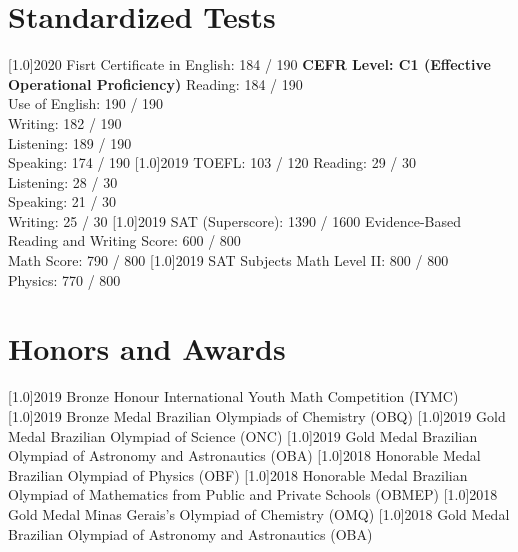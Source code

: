 \documentclass[]{cv-style}
\begin{document}
\section{Standardized Tests}
  \vspace{-0.2cm}
    \begin{entrylist}
        \entry
            {\scalebox{.8}[1.0]{2020}}
            {Fisrt Certificate in English: 184 / 190}
            {\textbf{CEFR Level: C1 (Effective Operational     Proficiency)}}
            {Reading: 184 / 190\\ Use of English: 190 / 190\\ Writing: 182 / 190\\ Listening: 189 / 190\\ Speaking: 174 / 190}
        \entry
            {\scalebox{.8}[1.0]{2019}}
            {TOEFL: 103 / 120} 
            {}
            {Reading: 29 / 30\\ Listening: 28 / 30    \\ Speaking: 21 / 30\\ Writing: 25 / 30}
        \entry
            {\scalebox{.8}[1.0]{2019}}
            {SAT (Superscore): 1390 / 1600} 
            {}
            {Evidence-Based Reading and Writing Score: 600 / 800\\ Math Score: 790 / 800}
        \entry
            {\scalebox{.8}[1.0]{2019}}
            {SAT Subjects}
            {}
            {Math Level II: 800 / 800\\ Physics: 770 / 800}
\end{entrylist}

\section{Honors and Awards}
    \vspace{-0.2cm}
    \begin{entrylist}
        \entry
            {\scalebox{.8}[1.0]{2019}}
            {Bronze Honour}
            {}
            {International Youth Math Competition (IYMC)}
        \entry
            {\scalebox{.8}[1.0]{2019}}
            {Bronze Medal}
            {}
            {Brazilian Olympiads of Chemistry (OBQ)}
        \entry
            {\scalebox{.8}[1.0]{2019}}
            {Gold Medal}
            {}
            {Brazilian Olympiad of Science (ONC)}
        \entry
            {\scalebox{.8}[1.0]{2019}}
            {Gold Medal}
            {}
            {Brazilian Olympiad of Astronomy and Astronautics (OBA)}
        \entry
            {\scalebox{.8}[1.0]{2018}}
            {Honorable Medal}
            {}
            {Brazilian Olympiad of Physics (OBF)}
        \entry
            {\scalebox{.8}[1.0]{2018}}
            {Honorable Medal}
            {}
            {Brazilian Olympiad of Mathematics from Public and Private Schools (OBMEP)}
        \entry
            {\scalebox{.8}[1.0]{2018}}
            {Gold Medal}
            {}
            {Minas Gerais's Olympiad of Chemistry (OMQ)}
        \entry
            {\scalebox{.8}[1.0]{2018}}
            {Gold Medal}
            {}
            {Brazilian Olympiad of Astronomy and Astronautics (OBA)}
            
    \end{entrylist}
\end{document}
